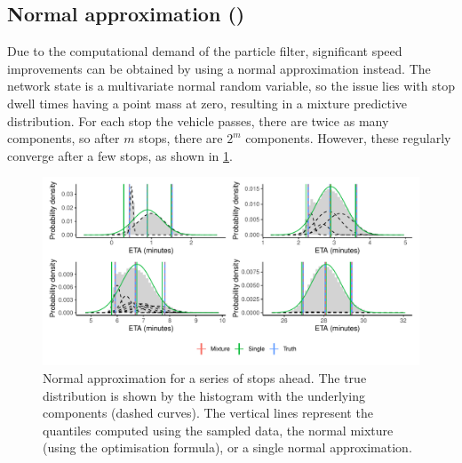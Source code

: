 \subsection[Normal approximation]{Normal approximation (\Fnorm{})}
\label{sec:prediction_arrival_time_normal}

Due to the computational demand of the particle filter, significant speed improvements can be obtained by using a normal approximation instead. The network state is a multivariate normal random variable, so the issue lies with stop dwell times having a point mass at zero, resulting in a mixture predictive distribution. For each stop the vehicle passes, there are twice as many components, so after $m$ stops, there are $2^m$ components. However, these regularly converge after a few stops, as shown in \cref{fig:normal_approx}.

\begin{knitrout}\small
{}\color{fgcolor}\begin{figure}

{\centering \includegraphics[width=\textwidth]{figure/normal_approx-1} 

}

\caption[Normal approximation for a series of stops ahead]{Normal approximation for a series of stops ahead. The true distribution is shown by the histogram with the underlying components (dashed curves). The vertical lines represent the quantiles computed using the sampled data, the normal mixture (using the optimisation formula), or a single normal approximation.}\label{fig:normal_approx}
\end{figure}


\end{knitrout}

